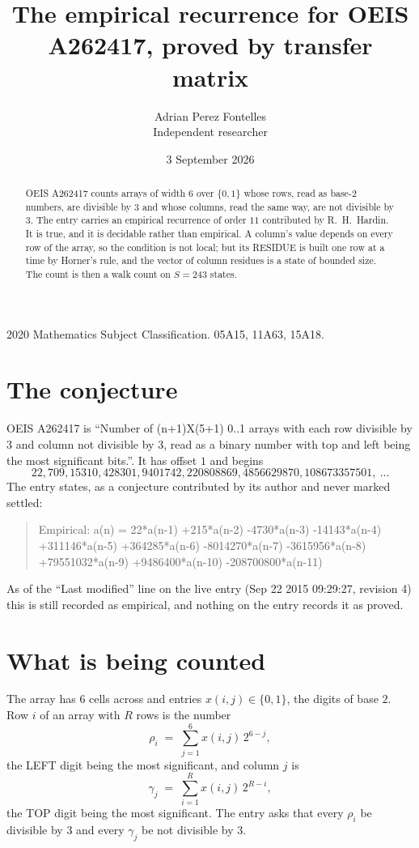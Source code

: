 \documentclass[11pt,a4paper]{article}
\title{The empirical recurrence for OEIS A262417, proved by transfer matrix}
\author{Adrian Perez Fontelles\\ \small Independent researcher}
\date{3 September 2026}
\theoremstyle{plain}
\theoremstyle{definition}
\begin{document}
\maketitle

\begin{abstract}
OEIS A262417 counts arrays of width $6$ over $\{0,1\}$ whose rows, read as base-$2$
numbers, are divisible by $3$ and whose columns, read the same way, are not divisible by
$3$. The entry carries an empirical recurrence of order $11$ contributed by
R.~H.~Hardin. It is true, and it is decidable rather than empirical. A column's value depends on
every row of the array, so the condition is not local; but its RESIDUE is built one row at a
time by Horner's rule, and the vector of column residues is a state of bounded size. The count
is then a walk count on $S=243$ states.
\end{abstract}

\noindent\small 2020 Mathematics Subject Classification. 05A15, 11A63, 15A18.\normalsize

\section{The conjecture}

OEIS A262417 is ``Number of (n+1)X(5+1) 0..1 arrays with each row divisible by 3 and column not divisible by 3, read as a binary number with top and left being the most significant bits.''. It has offset $1$ and begins
\[
22, 709, 15310, 428301, 9401742, 220808869, 4856629870, 108673357501,\ \dots
\]
The entry states, as a conjecture contributed by its author and never marked settled:
\begin{quote}
Empirical: a(n) = 22*a(n-1) +215*a(n-2) -4730*a(n-3) -14143*a(n-4) +311146*a(n-5) +364285*a(n-6) -8014270*a(n-7) -3615956*a(n-8) +79551032*a(n-9) +9486400*a(n-10) -208700800*a(n-11)
\end{quote}
As of the ``Last modified'' line on the live entry (Sep 22 2015 09:29:27, revision 4) this is still
recorded as empirical, and nothing on the entry records it as proved.

\section{What is being counted}

The array has $6$ cells across and entries $x(i,j)\in\{0,1\}$, the digits of
base $2$. Row $i$ of an array with $R$ rows is the number
\[
\rho_i\;=\;\sum_{j=1}^{6}x(i,j)\,2^{6-j} ,
\]
the LEFT digit being the most significant, and column $j$ is
\[
\gamma_j\;=\;\sum_{i=1}^{R}x(i,j)\,2^{R-i} ,
\]
the TOP digit being the most significant. The entry asks that every $\rho_i$ be divisible by
$3$ and every $\gamma_j$ be not divisible by $3$.
\end{document}
